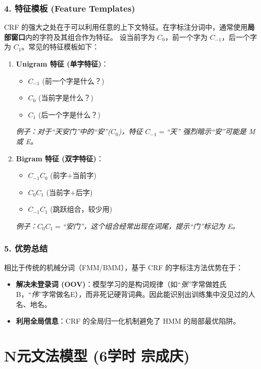 \documentclass[a4paper, 11pt]{ctexart}
\begin{document}
\subsubsection{4. 特征模板 (Feature Templates)}
CRF 的强大之处在于可以利用任意的上下文特征。在字标注分词中，通常使用\textbf{局部窗口}内的字符及其组合作为特征。
设当前字为 $C_0$，前一个字为 $C_{-1}$，后一个字为 $C_1$。常见的特征模板如下：

\begin{enumerate}
    \item \textbf{Unigram 特征 (单字特征)}：
    \begin{itemize}
        \item $C_{-1}$ (前一个字是什么？)
        \item $C_0$ (当前字是什么？)
        \item $C_1$ (后一个字是什么？)
    \end{itemize}
    \textit{例子：对于“天安门”中的“安”($C_0$)，特征 $C_{-1}=$“天” 强烈暗示“安”可能是 M 或 E。}
    
    \item \textbf{Bigram 特征 (双字特征)}：
    \begin{itemize}
        \item $C_{-1}C_0$ (前字+当前字)
        \item $C_0C_1$ (当前字+后字)
        \item $C_{-1}C_1$ (跳跃组合，较少用)
    \end{itemize}
    \textit{例子：$C_0C_1=$“安门”，这个组合经常出现在词尾，提示“门”标记为 E。}
\end{enumerate}

\subsubsection{5. 优势总结}
相比于传统的机械分词（FMM/BMM），基于 CRF 的字标注方法优势在于：
\begin{itemize}
    \item \textbf{解决未登录词 (OOV)}：模型学习的是构词规律（如“\textit{张}”字常做姓氏B，“\textit{伟}”字常做名E），而非死记硬背词典。因此能识别出训练集中没见过的人名、地名。
    \item \textbf{利用全局信息}：CRF 的全局归一化机制避免了 HMM 的局部最优陷阱。
\end{itemize}
\newpage

\section{N元文法模型 \small{(6学时 宗成庆)}}
\end{document}
